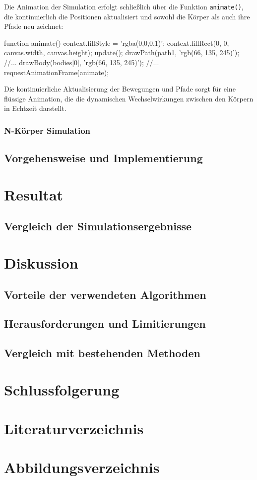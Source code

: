 \documentclass[a4paper,12pt,twoside]{article}
\begin{document}
Die Animation der Simulation erfolgt schließlich über die Funktion \texttt{animate()}, die kontinuierlich die Positionen aktualisiert und sowohl die Körper als auch ihre Pfade neu zeichnet:

\begin{javascript}
function animate() {
    context.fillStyle = 'rgba(0,0,0,1)';
    context.fillRect(0, 0, canvas.width, canvas.height);
    update();
    drawPath(path1, 'rgb(66, 135, 245)');
    //...
    drawBody(bodies[0], 'rgb(66, 135, 245)');
	//...
    requestAnimationFrame(animate);
}
\end{javascript}
Die kontinuierliche Aktualisierung der Bewegungen und Pfade sorgt für eine flüssige Animation, die die dynamischen Wechselwirkungen zwischen den Körpern in Echtzeit darstellt.

\subsubsection{N-Körper Simulation}

\subsection{Vorgehensweise und Implementierung}

\section{Resultat}
\subsection{Vergleich der Simulationsergebnisse}

\section{Diskussion}
\subsection{Vorteile der verwendeten Algorithmen}
\subsection{Herausforderungen und Limitierungen}
\subsection{Vergleich mit bestehenden Methoden}

\section{Schlussfolgerung}
\section{Literaturverzeichnis}
\section{Abbildungsverzeichnis}
\end{document}
